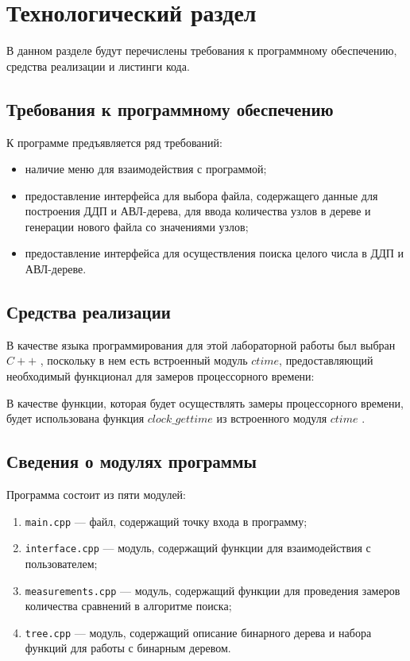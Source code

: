 \chapter{Технологический раздел}

В данном разделе будут перечислены требования к программному обеспечению, средства реализации и листинги кода.

\section{Требования к программному обеспечению}

К программе предъявляется ряд требований:

\begin{itemize} [label=--]
	\item наличие меню для взаимодействия с программой;
	\item предоставление интерфейса для выбора файла, содержащего данные для построения ДДП и АВЛ-дерева, для ввода количества узлов в дереве и генерации нового файла со значениями узлов;
	\item предоставление интерфейса для осуществления поиска целого числа в ДДП и АВЛ-дереве.
\end{itemize}

\section{Средства реализации}

В качестве языка программирования для этой лабораторной работы был выбран $C++$ \cite{pl}, поскольку в нем есть встроенный модуль $ctime$, предоставляющий необходимый функционал для замеров процессорного времени:

В качестве функции, которая будет осуществлять замеры процессорного времени, будет использована функция $clock\_gettime$ из встроенного модуля $ctime$ \cite{cpu_time_func}.

\section{Сведения о модулях программы}

Программа состоит из пяти модулей: 

\begin{enumerate}[label={\arabic*)}]
	\item \texttt{main.cpp} --- файл, содержащий точку входа в программу;
	\item \texttt{interface.cpp} --- модуль, содержащий функции для взаимодействия с пользователем;

\clearpage

	\item \texttt{measurements.cpp} --- модуль, содержащий функции для проведения замеров количества сравнений в алгоритме поиска;
	\item \texttt{tree.cpp} --- модуль, содержащий описание бинарного дерева и набора функций для работы с бинарным деревом.
\end{enumerate}

